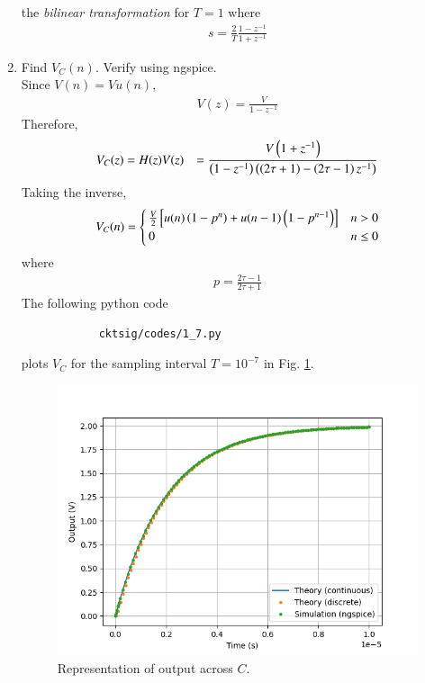 \documentclass[journal,12pt,twocolumn]{IEEEtran}
\renewcommand\thesection{\arabic{section}}
\begin{document}
\begin{enumerate}[label=\arabic*.,ref=\thesection.\theenumi]
the {\em bilinear transformation} for $T=1$ where
\begin{align}
    s = \frac{2}{T}\frac{1 - z^{-1}}{1 + z^{-1}}
\end{align}
%
\item Find $V_C(n)$. Verify using ngspice. 
\\
\solution Since $V(n) = Vu(n)$, 
\begin{align}
    V(z) = \frac{V}{1-z^{-1}}
\end{align}
Therefore,
\begin{align}
    V_C(z) &= H(z)V(z) 
         &= \frac{V\left(1+z^{-1}\right)}{\left(1-z^{-1}\right)\left(\left(2\tau+1\right)-\left(2\tau-1\right)z^{-1}\right)} \\
\end{align}
Taking the inverse,
\begin{align}
    V_C(n) = 
    \begin{cases}
        \frac{V}{2}\sbrak{u(n)\brak{1-p^n}+u(n-1)\brak{1-p^{n-1}}} & n > 0 \\
        0 & n \le 0
    \end{cases}
    \label{eq:cktsig/bilinear/vn}
\end{align}
where
\begin{align}
p = \frac{2\tau-1}{2\tau+1}
\end{align}
The following python code 
		\begin{lstlisting}
			cktsig/codes/1_7.py
		\end{lstlisting}
		plots $V_C$ for  the sampling interval
$T = 10^{-7}$  in Fig. 
    \ref{fig:cktsig/bilinear/vc}.
\begin{figure}
    \includegraphics[width=\columnwidth]{cktsig/figs/1_7.png}
    \caption{Representation of output across $C$.}
    \label{fig:cktsig/bilinear/vc}
\end{figure}
\end{enumerate}
\end{document}
